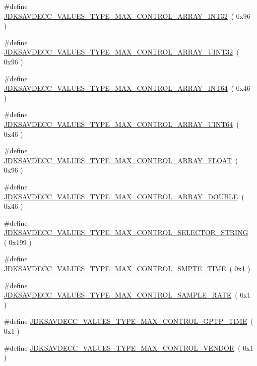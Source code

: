 \begin{DoxyCompactItemize}
\item 
\#define \hyperlink{group__values__type__max_gab901c62c307a61f72665f2d5ff57279d}{J\+D\+K\+S\+A\+V\+D\+E\+C\+C\+\_\+\+V\+A\+L\+U\+E\+S\+\_\+\+T\+Y\+P\+E\+\_\+\+M\+A\+X\+\_\+\+C\+O\+N\+T\+R\+O\+L\+\_\+\+A\+R\+R\+A\+Y\+\_\+\+I\+N\+T32}~( 0x96 )
\item 
\#define \hyperlink{group__values__type__max_ga6e91c872a8c56933f260cfe26f615026}{J\+D\+K\+S\+A\+V\+D\+E\+C\+C\+\_\+\+V\+A\+L\+U\+E\+S\+\_\+\+T\+Y\+P\+E\+\_\+\+M\+A\+X\+\_\+\+C\+O\+N\+T\+R\+O\+L\+\_\+\+A\+R\+R\+A\+Y\+\_\+\+U\+I\+N\+T32}~( 0x96 )
\item 
\#define \hyperlink{group__values__type__max_gaa5b3aadf250cbeb36ca051552985edc3}{J\+D\+K\+S\+A\+V\+D\+E\+C\+C\+\_\+\+V\+A\+L\+U\+E\+S\+\_\+\+T\+Y\+P\+E\+\_\+\+M\+A\+X\+\_\+\+C\+O\+N\+T\+R\+O\+L\+\_\+\+A\+R\+R\+A\+Y\+\_\+\+I\+N\+T64}~( 0x46 )
\item 
\#define \hyperlink{group__values__type__max_gacb217824b078101277b8f4dbc78e7fbb}{J\+D\+K\+S\+A\+V\+D\+E\+C\+C\+\_\+\+V\+A\+L\+U\+E\+S\+\_\+\+T\+Y\+P\+E\+\_\+\+M\+A\+X\+\_\+\+C\+O\+N\+T\+R\+O\+L\+\_\+\+A\+R\+R\+A\+Y\+\_\+\+U\+I\+N\+T64}~( 0x46 )
\item 
\#define \hyperlink{group__values__type__max_gae3468220e54a2a300356186a01a855ce}{J\+D\+K\+S\+A\+V\+D\+E\+C\+C\+\_\+\+V\+A\+L\+U\+E\+S\+\_\+\+T\+Y\+P\+E\+\_\+\+M\+A\+X\+\_\+\+C\+O\+N\+T\+R\+O\+L\+\_\+\+A\+R\+R\+A\+Y\+\_\+\+F\+L\+O\+AT}~( 0x96 )
\item 
\#define \hyperlink{group__values__type__max_ga2beeeb973006f8d0e310082b9618e43e}{J\+D\+K\+S\+A\+V\+D\+E\+C\+C\+\_\+\+V\+A\+L\+U\+E\+S\+\_\+\+T\+Y\+P\+E\+\_\+\+M\+A\+X\+\_\+\+C\+O\+N\+T\+R\+O\+L\+\_\+\+A\+R\+R\+A\+Y\+\_\+\+D\+O\+U\+B\+LE}~( 0x46 )
\item 
\#define \hyperlink{group__values__type__max_gab83e2588aab3b19050ff4b6c61dc5279}{J\+D\+K\+S\+A\+V\+D\+E\+C\+C\+\_\+\+V\+A\+L\+U\+E\+S\+\_\+\+T\+Y\+P\+E\+\_\+\+M\+A\+X\+\_\+\+C\+O\+N\+T\+R\+O\+L\+\_\+\+S\+E\+L\+E\+C\+T\+O\+R\+\_\+\+S\+T\+R\+I\+NG}~( 0x199 )
\item 
\#define \hyperlink{group__values__type__max_ga97445edf2d305233ffe030909d5f1ad8}{J\+D\+K\+S\+A\+V\+D\+E\+C\+C\+\_\+\+V\+A\+L\+U\+E\+S\+\_\+\+T\+Y\+P\+E\+\_\+\+M\+A\+X\+\_\+\+C\+O\+N\+T\+R\+O\+L\+\_\+\+S\+M\+P\+T\+E\+\_\+\+T\+I\+ME}~( 0x1 )
\item 
\#define \hyperlink{group__values__type__max_ga5187000aadd4ab54855d90a518a6491b}{J\+D\+K\+S\+A\+V\+D\+E\+C\+C\+\_\+\+V\+A\+L\+U\+E\+S\+\_\+\+T\+Y\+P\+E\+\_\+\+M\+A\+X\+\_\+\+C\+O\+N\+T\+R\+O\+L\+\_\+\+S\+A\+M\+P\+L\+E\+\_\+\+R\+A\+TE}~( 0x1 )
\item 
\#define \hyperlink{group__values__type__max_gaa7774ed81b0a1ed79b4bae44dda12010}{J\+D\+K\+S\+A\+V\+D\+E\+C\+C\+\_\+\+V\+A\+L\+U\+E\+S\+\_\+\+T\+Y\+P\+E\+\_\+\+M\+A\+X\+\_\+\+C\+O\+N\+T\+R\+O\+L\+\_\+\+G\+P\+T\+P\+\_\+\+T\+I\+ME}~( 0x1 )
\item 
\#define \hyperlink{group__values__type__max_ga09fec4f62625c692833a7da1d8555b46}{J\+D\+K\+S\+A\+V\+D\+E\+C\+C\+\_\+\+V\+A\+L\+U\+E\+S\+\_\+\+T\+Y\+P\+E\+\_\+\+M\+A\+X\+\_\+\+C\+O\+N\+T\+R\+O\+L\+\_\+\+V\+E\+N\+D\+OR}~( 0x1 )
\end{DoxyCompactItemize}


